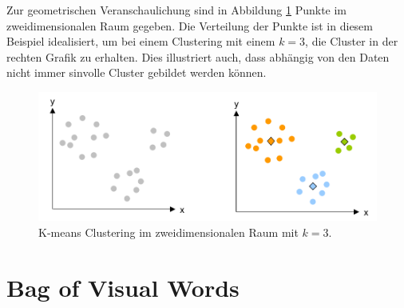 Zur geometrischen Veranschaulichung sind in Abbildung \ref{img:bovw} Punkte im zweidimensionalen Raum gegeben. Die Verteilung der Punkte ist in diesem Beispiel idealisiert, um bei einem Clustering mit einem $k = 3$, die Cluster in der rechten Grafik zu erhalten. Dies illustriert auch, dass abhängig von den Daten nicht immer sinvolle Cluster gebildet werden können. \cite{mmd2011}

\begin{figure}
	\centering
	\includegraphics[scale=0.55]{images/kmeans.png}
	\caption{K-means Clustering im zweidimensionalen Raum mit $k = 3$.}
	\label{img:bovw}
\end{figure}

\section{Bag of Visual Words}

